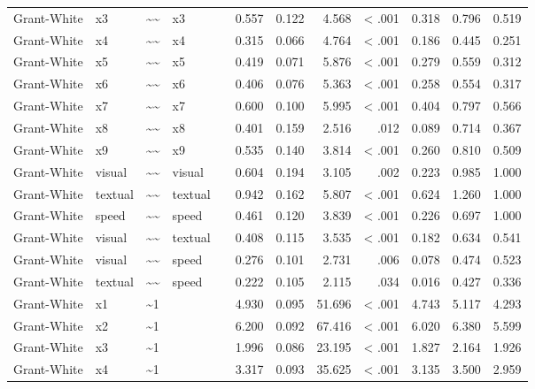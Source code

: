 \documentclass[11pt]{article}
\begin{document}
\begin{landscape}
\begin{longtable}{llllrrrrrrrr}
Grant-White & x3 & \textasciitilde{}\textasciitilde{} & x3 &  & 0.557 & 0.122 & 4.568 & < .001 & 0.318 & 0.796 & 0.519 \\
Grant-White & x4 & \textasciitilde{}\textasciitilde{} & x4 &  & 0.315 & 0.066 & 4.764 & < .001 & 0.186 & 0.445 & 0.251 \\
Grant-White & x5 & \textasciitilde{}\textasciitilde{} & x5 &  & 0.419 & 0.071 & 5.876 & < .001 & 0.279 & 0.559 & 0.312 \\
Grant-White & x6 & \textasciitilde{}\textasciitilde{} & x6 &  & 0.406 & 0.076 & 5.363 & < .001 & 0.258 & 0.554 & 0.317 \\
Grant-White & x7 & \textasciitilde{}\textasciitilde{} & x7 &  & 0.600 & 0.100 & 5.995 & < .001 & 0.404 & 0.797 & 0.566 \\
Grant-White & x8 & \textasciitilde{}\textasciitilde{} & x8 &  & 0.401 & 0.159 & 2.516 & .012 & 0.089 & 0.714 & 0.367 \\
Grant-White & x9 & \textasciitilde{}\textasciitilde{} & x9 &  & 0.535 & 0.140 & 3.814 & < .001 & 0.260 & 0.810 & 0.509 \\
Grant-White & visual & \textasciitilde{}\textasciitilde{} & visual &  & 0.604 & 0.194 & 3.105 & .002 & 0.223 & 0.985 & 1.000 \\
Grant-White & textual & \textasciitilde{}\textasciitilde{} & textual &  & 0.942 & 0.162 & 5.807 & < .001 & 0.624 & 1.260 & 1.000 \\
Grant-White & speed & \textasciitilde{}\textasciitilde{} & speed &  & 0.461 & 0.120 & 3.839 & < .001 & 0.226 & 0.697 & 1.000 \\
Grant-White & visual & \textasciitilde{}\textasciitilde{} & textual &  & 0.408 & 0.115 & 3.535 & < .001 & 0.182 & 0.634 & 0.541 \\
Grant-White & visual & \textasciitilde{}\textasciitilde{} & speed &  & 0.276 & 0.101 & 2.731 & .006 & 0.078 & 0.474 & 0.523 \\
Grant-White & textual & \textasciitilde{}\textasciitilde{} & speed &  & 0.222 & 0.105 & 2.115 & .034 & 0.016 & 0.427 & 0.336 \\
Grant-White & x1 & \textasciitilde{}1 &  &  & 4.930 & 0.095 & 51.696 & < .001 & 4.743 & 5.117 & 4.293 \\
Grant-White & x2 & \textasciitilde{}1 &  &  & 6.200 & 0.092 & 67.416 & < .001 & 6.020 & 6.380 & 5.599 \\
Grant-White & x3 & \textasciitilde{}1 &  &  & 1.996 & 0.086 & 23.195 & < .001 & 1.827 & 2.164 & 1.926 \\
Grant-White & x4 & \textasciitilde{}1 &  &  & 3.317 & 0.093 & 35.625 & < .001 & 3.135 & 3.500 & 2.959 \\

\end{longtable}
\end{landscape}
\end{document}
